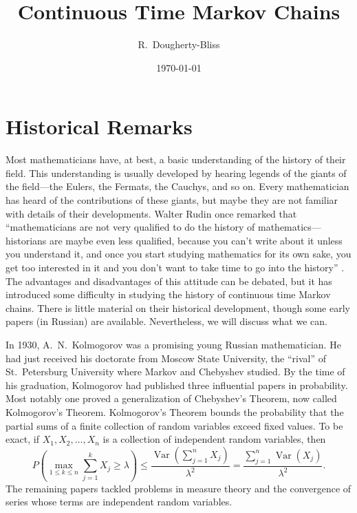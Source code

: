 \documentclass[12pt]{article}
\title{Continuous Time Markov Chains}
\author{R.~Dougherty-Bliss}
\date{\today}
\DeclareMathOperator{\var}{Var}
\theoremstyle{definition}
\begin{document}
\maketitle

\section{Historical Remarks}
\label{sec:historical_remarks}

Most mathematicians have, at best, a basic understanding of the history of
their field. This understanding is usually developed by hearing legends of the
giants of the field---the Eulers, the Fermats, the Cauchys, and so on. Every
mathematician has heard of the contributions of these giants, but maybe they
are not familiar with details of their developments. Walter Rudin once remarked
that ``mathematicians are not very qualified to do the history of
mathematics---historians are maybe even less qualified, because you can't write
about it unless you understand it, and once you start studying mathematics for
its own sake, you get too interested in it and you don't want to take time to
go into the history'' \citep{rudin2014offspring}. The advantages and
disadvantages of this attitude can be debated, but it has introduced some
difficulty in studying the history of continuous time Markov chains. There is
little material on their historical development, though some early papers (in
Russian) are available. Nevertheless, we will discuss what we can.

In 1930, A.~N.~Kolmogorov was a promising young Russian mathematician. He had
just received his doctorate from Moscow State University, the ``rival'' of
St.~Petersburg University where Markov and Chebyshev studied. By the time of
his graduation, Kolmogorov had published three influential papers in
probability.  Most notably one proved a generalization of Chebyshev's Theorem,
now called Kolmogorov's Theorem. Kolmogorov's Theorem bounds the probability
that the partial sums of a finite collection of random variables exceed fixed
values. To be exact, if $X_1, X_2, \dots, X_n$ is a collection of independent
random variables, then
\begin{equation*}
    P \left(\max_{1 \leq k \leq n} \sum_{j = 1}^k X_j \geq \lambda \right)
        \leq
        \frac{\var \left( \sum_{j = 1}^n X_j \right)}{\lambda^2} =
        \frac{\sum_{j = 1}^n \var(X_j)}{\lambda^2}.
\end{equation*}
The remaining papers tackled problems in measure theory and the convergence of
series whose terms are independent random variables.
\end{document}
